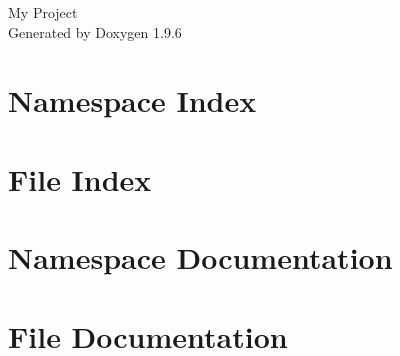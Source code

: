 \documentclass[twoside]{book}
\newcommand{\+}{\discretionary{\mbox{\scriptsize$\hookleftarrow$}}{}{}}
\newcommand{\clearemptydoublepage}{%
    \newpage{\pagestyle{empty}\cleardoublepage}%
  }
\begin{document}
  \raggedbottom
    \hypersetup{pageanchor=false,
                bookmarksnumbered=true,
                pdfencoding=unicode
               }
  \begin{titlepage}
  \vspace*{7cm}
  \begin{center}%
  {\Large My Project}\\
  \vspace*{1cm}
  {\large Generated by Doxygen 1.9.6}\\
  \end{center}
  \end{titlepage}
  \clearemptydoublepage
  \tableofcontents
  \clearemptydoublepage
  \hypersetup{pageanchor=true}
\chapter{Namespace Index}

\chapter{File Index}

\chapter{Namespace Documentation}










\chapter{File Documentation}










  \backmatter
  \newpage
  \clearemptydoublepage
  \printindex
\end{document}
